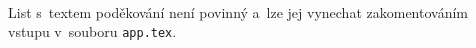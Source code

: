 
\pagestyle{StyleBlank}

{~}
\vfill

\noindent
List s~textem poděkování není povinný a~lze jej vynechat zakomentováním vstupu
v~souboru \texttt{app.tex}.

\newpage
